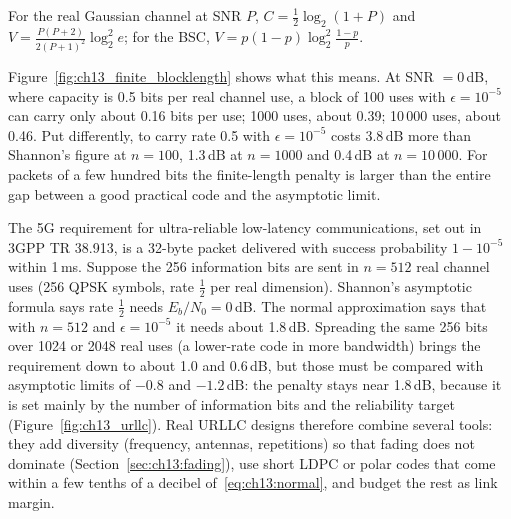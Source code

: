 For the real Gaussian channel at SNR $P$, $C=\frac12\log_2(1+P)$ and
$V=\frac{P(P+2)}{2(P+1)^2}\log_2^2e$; for the BSC, $V=p(1-p)\log_2^2\frac{1-p}{p}$.


Figure~\ref{fig:ch13_finite_blocklength} shows what this means. At SNR $=0$\,dB, where capacity is
0.5 bits per real channel use, a block of 100 uses with $\epsilon=10^{-5}$ can carry only about
0.16 bits per use; 1000 uses, about 0.39; 10\,000 uses, about 0.46. Put differently, to carry rate
0.5 with $\epsilon=10^{-5}$ costs 3.8\,dB more than Shannon's figure at $n=100$, 1.3\,dB at
$n=1000$ and 0.4\,dB at $n=10\,000$. For packets of a few hundred bits the finite-length penalty is
larger than the entire gap between a good practical code and the asymptotic limit.

\begin{worked}
The 5G requirement for ultra-reliable low-latency communications, set out in 3GPP TR 38.913, is a
32-byte packet delivered with success probability $1-10^{-5}$ within 1\,ms. Suppose the 256
information bits are sent in $n=512$ real channel uses (256 QPSK symbols, rate $\frac12$ per real
dimension). Shannon's asymptotic formula says rate $\frac12$ needs $E_b/N_0=0$\,dB. The normal
approximation says that with $n=512$ and $\epsilon=10^{-5}$ it needs about 1.8\,dB. Spreading the
same 256 bits over 1024 or 2048 real uses (a lower-rate code in more bandwidth) brings the
requirement down to about 1.0 and 0.6\,dB, but those must be compared with asymptotic limits of
$-0.8$ and $-1.2$\,dB: the penalty stays near 1.8\,dB, because it is set mainly by the number of
information bits and the reliability target (Figure~\ref{fig:ch13_urllc}). Real URLLC designs therefore combine several tools:
they add diversity (frequency, antennas, repetitions) so that fading does not dominate
(Section~\ref{sec:ch13:fading}), use short LDPC or polar codes that come within a few tenths of a
decibel of~\eqref{eq:ch13:normal}, and budget the rest as link margin.
\end{worked}

